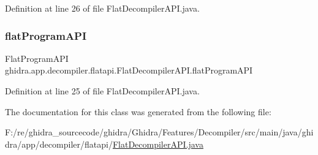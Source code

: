 Definition at line 26 of file Flat\+Decompiler\+A\+P\+I.\+java.

\mbox{\label{classghidra_1_1app_1_1decompiler_1_1flatapi_1_1_flat_decompiler_a_p_i_ad3d370c5dfc4c684a11c360595f9b15b}} 
\subsubsection{\texorpdfstring{flatProgramAPI}{flatProgramAPI}}
{\footnotesize\ttfamily Flat\+Program\+A\+PI ghidra.\+app.\+decompiler.\+flatapi.\+Flat\+Decompiler\+A\+P\+I.\+flat\+Program\+A\+PI\hspace{0.3cm}{\ttfamily [protected]}}



Definition at line 25 of file Flat\+Decompiler\+A\+P\+I.\+java.



The documentation for this class was generated from the following file\+:\begin{DoxyCompactItemize}
\item 
F\+:/re/ghidra\+\_\+sourcecode/ghidra/\+Ghidra/\+Features/\+Decompiler/src/main/java/ghidra/app/decompiler/flatapi/\mbox{\hyperlink{_flat_decompiler_a_p_i_8java}{Flat\+Decompiler\+A\+P\+I.\+java}}\end{DoxyCompactItemize}
